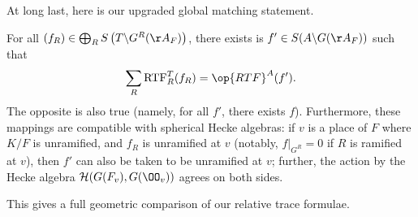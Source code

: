 \documentclass[../notes.tex]{subfiles}
\begin{document}
At long last, here is our upgraded global matching statement.
\begin{theorem}
	For all $(f_R)\in\bigoplus_RS\left(T\backslash G^R(\AA_F)\right)$, there exists is $f'\in S(A\backslash G(\AA_F))$ such that
	\[\sum_R\mathrm{RTF}_R^T(f_R)=\op{RTF}^A(f').\]
	The opposite is also true (namely, for all $f'$, there exists $f$). Furthermore, these mappings are compatible with spherical Hecke algebras: if $v$ is a place of $F$ where $K/F$ is unramified, and $f_R$ is unramified at $v$ (notably, $f|_{G^R}=0$ if $R$ is ramified at $v$), then $f'$ can also be taken to be unramified at $v$; further, the action by the Hecke algebra $\mathcal H(G(F_v),G(\OO_v))$ agrees on both sides.
\end{theorem}
This gives a full geometric comparison of our relative trace formulae.
\end{document}
